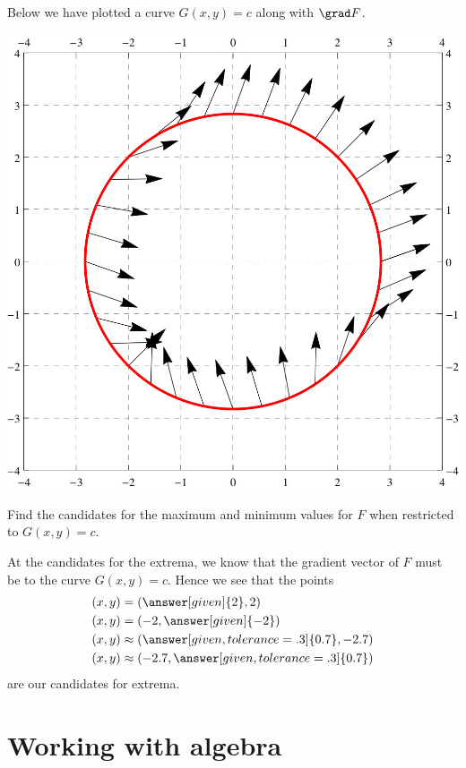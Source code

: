 \documentclass{ximera}
\begin{document}
\begin{example}
  Below we have plotted a curve $G(x,y) = c$ along with $\grad F$.
  \begin{image}
    \includegraphics{curveVectors1.jpg}
  \end{image}
  Find the candidates for the maximum and minimum values for $F$ when
  restricted to $G(x,y) = c$.
  \begin{explanation}
    At the candidates for the extrema, we know that the gradient
    vector of $F$ must be
     to
    the curve $G(x,y) = c$. Hence we
    see that the points
    \begin{align*}
      (x,y) &= \left(\answer[given]{2},2\right)\\
      (x,y) &= \left(-2,\answer[given]{-2}\right)\\
      (x,y) &\approx \left(\answer[given,tolerance=.3]{0.7},-2.7\right)\\
      (x,y) &\approx \left(-2.7,\answer[given,tolerance=.3]{0.7}\right)
    \end{align*}
    are our candidates for extrema.
  \end{explanation}
\end{example}


\section{Working with algebra}
\end{document}

